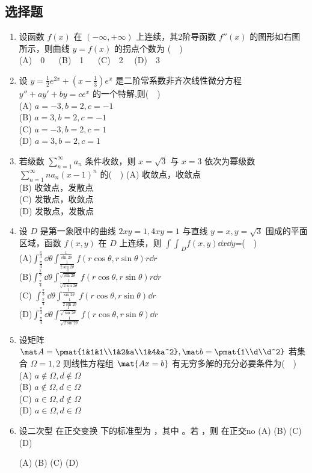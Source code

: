 \subsection{选择题}
\begin{enumerate}($\quad$)
\item 设函数 $f(x)$ 在 $(-\infty,+\infty)$ 上连续，其2阶导函数 $f''(x)$  的图形如右图所示，则曲线 $y=f(x)$ 的拐点个数为 ($\quad$)\\
(A)$\quad$0  $\quad$  (B)$\quad$1 $\quad$  (C)$\quad$2  $\quad$(D)$\quad$3 
\item 设 $y=\frac{1}{2}e^{2x}+(x-\frac{1}{3})e^x$ 是二阶常系数非齐次线性微分方程 $y''+ay'+by=ce^x$  的一个特解,则($\quad$)\\
(A) $a=-3,b=2,c=-1$\\
(B) $a=3,b=2,c=-1$\\
(C) $a=-3,b=2,c=1$\\
(D) $a=3,b=2,c=1$
\item 若级数 $\displaystyle \sum_{n=1}^\infty a_n $ 条件收敛，则 $x=\sqrt{3}$ 与 $x=3$  依次为幂级数 $\displaystyle \sum_{n=1}^\infty na_n(x-1)^n$  的($\quad$)
(A) 收敛点，收敛点\\
(B) 收敛点，发散点\\
(C) 发散点，收敛点\\
(D) 发散点，发散点
\item  设 $D$ 是第一象限中的曲线 $2xy=1,4xy=1$   与直线 $y=x,y=\sqrt{3}$  围成的平面区域，函数 $f(x,y)$   在 $D$ 上连续，则 $\displaystyle {\int \int}_D f(x,y)\dd{x}\dd{y}$=($\quad$)\\
(A)$\displaystyle  \int_\frac{\pi}{4}^\frac{\pi}{3}\dd{\theta}\int_\frac{1}{2\sin 2\theta}^\frac{1}{\sin 2\theta}f(r\cos \theta,r\sin \theta)r\dd{r}$\\
(B)$\displaystyle  \int_\frac{\pi}{4}^\frac{\pi}{3}\dd{\theta}\int_\frac{1}{\sqrt{2\sin 2\theta}}^\frac{1}{\sqrt{\sin 2\theta}}f(r\cos \theta,r\sin \theta)r\dd{r}$\\
(C) $\displaystyle  \int_\frac{\pi}{4}^\frac{\pi}{3}\dd{\theta}\int_\frac{1}{2\sin 2\theta}^\frac{1}{\sin 2\theta}f(r\cos \theta,r\sin \theta)\dd{r}$\\
(D)$\displaystyle  \int_\frac{\pi}{4}^\frac{\pi}{3}\dd{\theta}\int_\frac{1}{\sqrt{2\sin 2\theta}}^\frac{1}{\sqrt{\sin 2\theta}}f(r\cos \theta,r\sin \theta)\dd{r}$
\item 设矩阵 $\mat A=\pmat{1&1&1\\1&2&a\\1&4&a^2},\mat b=\pmat{1\\d\\d^2}$  若集合 $\Omega={1,2}$ 则线性方程组 $\mat{ Ax=b}$  有无穷多解的充分必要条件为($\quad$)\\
(A) $a\notin \Omega,d\notin \Omega$ \\
(B) $a\notin \Omega,d\in \Omega$\\
(C) $a\in \Omega,d\notin \Omega$\\
(D) $a\in \Omega,d\in \Omega$\\
\item 设二次型  在正交变换   下的标准型为 ，其中  。若  ，则   在正交no
(A) 
(B)
(C) 
(D)

(A) 
(B)
(C) 
(D)



\end{enumerate}
